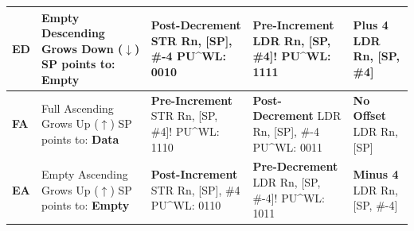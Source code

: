 \documentclass[../comorg-part1.tex]{subfiles}
\begin{document}
\begin{landscape}
\begin{center}
\begin{minipage}{\linewidth}
\begin{tabular}{|l|>{\centering\arraybackslash}p{3.5cm}|>{\centering\arraybackslash}p{4cm}|>{\centering\arraybackslash}p{4cm}|>{\centering\arraybackslash}p{3.5cm}|}
        \textbf{ED} & 
        Empty Descending \newline Grows Down ($\downarrow$) \newline SP points to: \textbf{Empty} & 
        \textbf{Post-Decrement} \newline \ttfamily STR Rn, [SP], \#-4 \newline PU\^{}WL: 0010 & 
        \textbf{Pre-Increment} \newline \ttfamily LDR Rn, [SP, \#4]! \newline PU\^{}WL: 1111 &
        \textbf{Plus 4} \newline \ttfamily LDR Rn, [SP, \#4] \\ 
        \hline

        \textbf{FA} & 
        Full Ascending \newline Grows Up ($\uparrow$) \newline SP points to: \textbf{Data} & 
        \textbf{Pre-Increment} \newline \ttfamily STR Rn, [SP, \#4]! \newline PU\^{}WL: 1110 & 
        \textbf{Post-Decrement} \newline \ttfamily LDR Rn, [SP], \#-4 \newline PU\^{}WL: 0011 &
        \textbf{No Offset} \newline \ttfamily LDR Rn, [SP] \\ 
        \hline

        \textbf{EA} & 
        Empty Ascending \newline Grows Up ($\uparrow$) \newline SP points to: \textbf{Empty} & 
        \textbf{Post-Increment} \newline \ttfamily STR Rn, [SP], \#4 \newline PU\^{}WL: 0110 & 
        \textbf{Pre-Decrement} \newline \ttfamily LDR Rn, [SP, \#-4]! \newline PU\^{}WL: 1011 &
        \textbf{Minus 4} \newline \ttfamily LDR Rn, [SP, \#-4] \\ 
        \hline
        \end{tabular}
        
        \vspace{15pt}
    \end{minipage}
\end{center}


\end{landscape}
\end{document}
